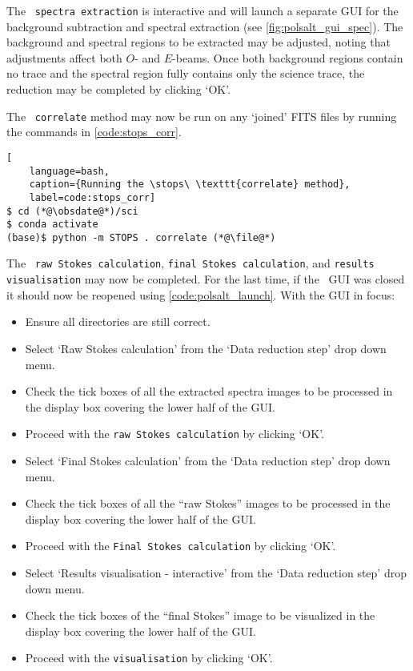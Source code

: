 The \polsalt\ \texttt{spectra extraction} is interactive and will launch a separate \gls{GUI} for the background subtraction and spectral extraction (see \autoref{fig:polsalt_gui_spec}). The background and spectral regions to be extracted may be adjusted, noting that adjustments affect both $O$- and $E$-beams. Once both background regions contain no trace and the spectral region fully contains only the science trace, the reduction may be completed by clicking `OK'.

\pagebreak

The \stops\ \texttt{correlate} method may now be run on any `joined' \gls{FITS} files by running the commands in \autoref{code:stops_corr}.

\begin{lstlisting}[
    language=bash,
    caption={Running the \stops\ \texttt{correlate} method},
    label=code:stops_corr]
$ cd (*@\obsdate@*)/sci
$ conda activate
(base)$ python -m STOPS . correlate (*@\file@*)
\end{lstlisting}

The \polsalt\ \texttt{raw Stokes calculation}, \texttt{final Stokes calculation}, and \texttt{results visualisation} may now be completed. For the last time, if the \polsalt\ \gls{GUI} was closed it should now be reopened using \autoref{code:polsalt_launch}. With the \gls{GUI} in focus:
\begin{itemize}
    \item Ensure all directories are still correct.
    \item Select `Raw Stokes calculation' from the `Data reduction step' drop down menu.
    \item Check the tick boxes of all the extracted spectra images to be processed in the display box covering the lower half of the \gls{GUI}.
    \item Proceed with the \texttt{raw Stokes calculation} by clicking `OK'.
    \item Select `Final Stokes calculation' from the `Data reduction step' drop down menu.
    \item Check the tick boxes of all the ``raw Stokes'' images to be processed in the display box covering the lower half of the \gls{GUI}.
    \item Proceed with the \texttt{Final Stokes calculation} by clicking `OK'.
    \item Select `Results visualisation - interactive' from the `Data reduction step' drop down menu.
    \item Check the tick boxes of the ``final Stokes'' image to be visualized in the display box covering the lower half of the \gls{GUI}.
    \item Proceed with the \texttt{visualisation} by clicking `OK'.
\end{itemize}

